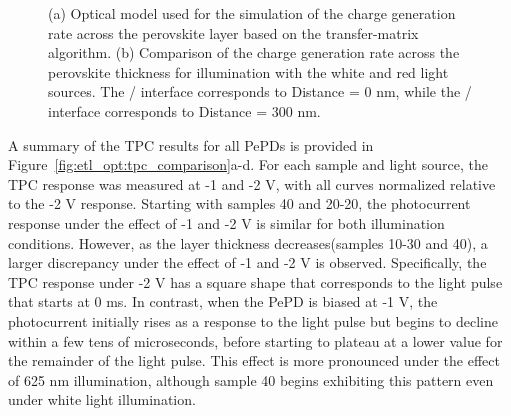 \begin{figure}[ht!]
\begin{subfigure}[t]{0.4\textwidth}
        \caption{}
        \label{}
    \end{subfigure}
    \caption{(a) Optical model used for the simulation of the charge generation rate across the perovskite layer based on the transfer-matrix algorithm. (b) Comparison of the charge generation rate across the perovskite thickness for illumination with the white and red light sources. The / interface corresponds to Distance = 0 nm, while the / interface corresponds to Distance = 300 nm.}
    \label{fig:etl_opt:tpc_simulation}
\end{figure}


A summary of the TPC results for all PePDs is provided in Figure~\ref{fig:etl_opt:tpc_comparison}a-d. For each sample and light source, the TPC response was measured at -1 and -2 V, with all curves normalized relative to the -2 V response. Starting with samples 40 and 20-20, the photocurrent response under the effect of -1 and -2 V is similar for both illumination conditions. However, as the  layer thickness decreases(samples 10-30 and 40), a larger discrepancy under the effect of -1 and -2 V is observed. Specifically, the TPC response under -2 V has a square shape that corresponds to the light pulse that starts at 0 ms. In contrast, when the PePD is biased at -1 V, the photocurrent initially rises as a response to the light pulse but begins to decline within a few tens of microseconds, before starting to plateau at a lower value for the remainder of the light pulse. This effect is more pronounced under the effect of 625 nm illumination, although sample 40 begins exhibiting this pattern even under white light illumination.


